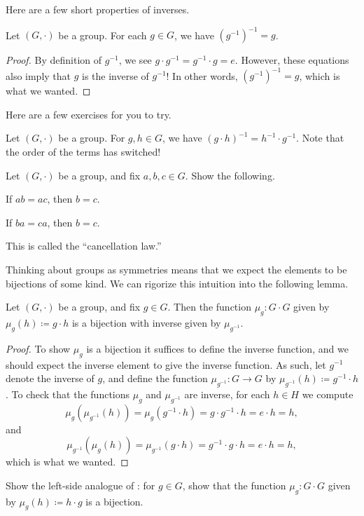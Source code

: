 \documentclass[../notes.tex]{subfiles}
\begin{document}
Here are a few short properties of inverses.
\begin{lemma} \label{lem:inv-inv}
    Let $(G,\cdot)$ be a group. For each $g\in G$, we have $\left(g^{-1}\right)^{-1}=g$.
\end{lemma}
\begin{proof}
    By definition of $g^{-1}$, we see $g\cdot g^{-1}=g^{-1}\cdot g=e$. However, these equations also imply that $g$ is the inverse of $g^{-1}$! In other words, $\left(g^{-1}\right)^{-1}=g$, which is what we wanted.
\end{proof}
Here are a few exercises for you to try.
\begin{exe} \label{exe:inverse-prod}
    Let $(G,\cdot)$ be a group. For $g,h\in G$, we have $(g\cdot h)^{-1}=h^{-1}\cdot g^{-1}$. Note that the order of the terms has switched!
\end{exe}
\begin{exe}
    Let $(G,\cdot)$ be a group, and fix $a,b,c\in G$. Show the following.
    \begin{listalph}
        \item If $ab=ac$, then $b=c$.
        \item If $ba=ca$, then $b=c$.
    \end{listalph}
    This is called the ``cancellation law.''
\end{exe}
Thinking about groups as symmetries means that we expect the elements to be bijections of some kind. We can rigorize this intuition into the following lemma.
\begin{proposition} \label{prop:mult-is-bij}
    Let $(G,\cdot)$ be a group, and fix $g\in G$. Then the function $\mu_g\colon G\cdot G$ given by $\mu_g(h)\coloneqq g\cdot h$ is a bijection with inverse given by $\mu_{g^{-1}}$.
\end{proposition}
\begin{proof}
    To show $\mu_g$ is a bijection it suffices to define the inverse function, and we should expect the inverse element to give the inverse function. As such, let $g^{-1}$ denote the inverse of $g$, and define the function $\mu_{g^{-1}}\colon G\to G$ by $\mu_{g^{-1}}(h)\coloneqq g^{-1}\cdot h$. To check that the functions $\mu_g$ and $\mu_{g^{-1}}$ are inverse, for each $h\in H$ we compute
    \[\mu_g\left(\mu_{g^{-1}}(h)\right) = \mu_g\left(g^{-1}\cdot h\right) = g\cdot g^{-1}\cdot h=e\cdot h=h,\]
    and
    \[\mu_{g^{-1}}(\mu_g(h))=\mu_{g^{-1}}(g\cdot h)=g^{-1}\cdot g\cdot h=e\cdot h=h,\]
    which is what we wanted.
\end{proof}
\begin{exe}
    Show the left-side analogue of : for $g\in G$, show that the function $\mu_g\colon G\cdot G$ given by $\mu_g(h)\coloneqq h\cdot g$ is a bijection.
\end{exe}
\end{document}
